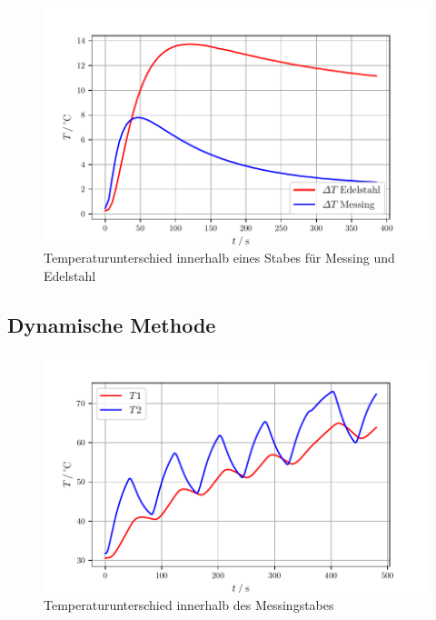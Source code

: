 \begin{figure}
    \centering
    \includegraphics[width=\textwidth]{data/deltaT.pdf}
    \caption{Temperaturunterschied innerhalb eines Stabes für Messing und Edelstahl}
    \label{fig:deltat}
\end{figure}


\subsection{Dynamische Methode}

\begin{figure}
    \centering
    \includegraphics[width=\textwidth]{data/T1T2.pdf}
    \caption{Temperaturunterschied innerhalb des Messingstabes}
    \label{fig:t1t2}
\end{figure}

